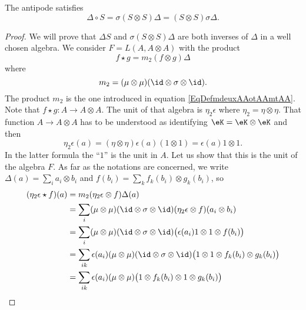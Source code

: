 \begin{proposition}
	The antipode satisfies
	\begin{equation}
		\Delta\circ S=\sigma(S\otimes S)\Delta=(S\otimes S)\sigma\Delta.
	\end{equation}
\end{proposition}

\begin{proof}
	We will prove that \( \Delta S\) and \( \sigma(S\otimes S)\Delta\) are both inverses of \( \Delta\) in a well chosen algebra. We consider $F=L(A,A\otimes A)$ with the product
	\begin{equation}
		f\star g=m_2(f\otimes g)\Delta
	\end{equation}
	where
	\begin{equation}
		m_2=(\mu\otimes\mu)(\id\otimes \sigma\otimes\id).
	\end{equation}
	The product \( m_2\) is the one introduced in equation \eqref{EqDefmdeuxAAotAAmtAA}. Note that \( f\star g\colon A\to A\otimes A\). The unit of that algebra is \( \eta_2\epsilon\) where \( \eta_2=\eta\otimes \eta\). That function \( A\to A\otimes A\) has to be understood as identifying \( \eK=\eK\otimes\eK\) and then
	\begin{equation}
		\eta_2\epsilon(a)=(\eta\otimes\eta)\epsilon(a)(1\otimes 1)=\epsilon(a)1\otimes 1.
	\end{equation}
	In the latter formula the ``\( 1\)'' is the unit in \( A\). Let us show that this is the unit of the algebra \( F\). As far as the notations are concerned, we write \( \Delta(a)=\sum_ia_i\otimes b_i\) and  \( f(b_i)=\sum_k f_k(b_i)\otimes g_k(b_i)\), so
	\begin{equation}
		\begin{aligned}[]
			(\eta_2\epsilon\star f)(a) & =m_2(\eta_2\epsilon\otimes f)\Delta(a)                                                                                   \\
			                           & =\sum_i(\mu\otimes\mu)(\id\otimes\sigma\otimes\id)(\eta_2\epsilon\otimes f)(a_i\otimes b_i)                              \\
			                           & =\sum_i(\mu\otimes\mu)(\id\otimes\sigma\otimes\id)\big( \epsilon(a_i)1\otimes 1\otimes f(b_i) \big)                      \\
			                           & =\sum_{ik}\epsilon(a_i)(\mu\otimes\mu)(\id\otimes\sigma\otimes\id)\big( 1\otimes 1\otimes f_k(b_i)\otimes g_k(b_i) \big) \\
			                           & =\sum_{ik}\epsilon(a_i)(\mu\otimes\mu)\big( 1\otimes f_k(b_i)\otimes 1\otimes g_k(b_i) \big)                             \\

\end{aligned}
\end{equation}
\end{proof}
